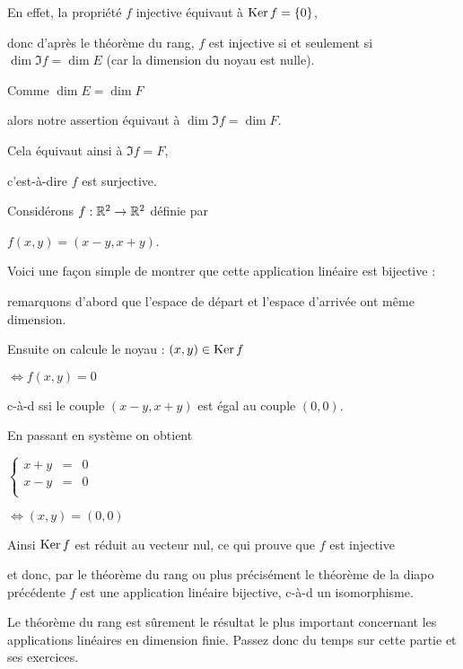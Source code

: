 \change
En effet, la propriété
$f$ injective équivaut à $\mathop{\text{Ker}}\nolimits f = \{0\}$, 

\change
donc d'après le théorème du rang, 
$f$ est injective si et seulement si $\dim \Im f =\dim
E$ (car la dimension du noyau est nulle). 

\change
Comme $\dim E = \dim F$

alors notre assertion équivaut à  $\dim \Im f=\dim F$.

\change
Cela équivaut ainsi à $\Im f =F$, 

\change
c'est-à-dire $f$ est surjective.

\diapo

Considérons $f : \mathbb{R}^2 \to \mathbb{R}^2$ définie par 

$f(x,y) = (x-y,x+y)$.

\change
Voici une façon simple de montrer que cette application linéaire est bijective :

\change
remarquons d'abord que l'espace de départ et l'espace d'arrivée ont même dimension.

\change
Ensuite on calcule le noyau :
$(x,y) \in \mathop{\text{Ker}}\nolimits f$ 

\change
$\iff f(x,y)=0$

\change
c-à-d ssi le couple $(x-y,x+y)$ est égal au couple $(0,0)$.

\change
En passant en système on obtient

$\left\{
\begin{array}{rcl}
x+y & = & 0 \\
x-y & = & 0 \\
\end{array}
\right. $

\change
$\iff (x,y) = (0,0)$

\change
Ainsi $\mathop{\text{Ker}}\nolimits f $ est réduit au vecteur nul, ce qui prouve que $f$ est injective

\change
et donc, par le théorème du rang ou plus précisément le théorème de la diapo précédente
$f$ est une application linéaire bijective, c-à-d un isomorphisme.


\diapo

Le théorème du rang est sûrement le résultat
le plus important concernant les applications
linéaires en dimension finie. Passez donc du temps
sur cette partie et ses exercices.




